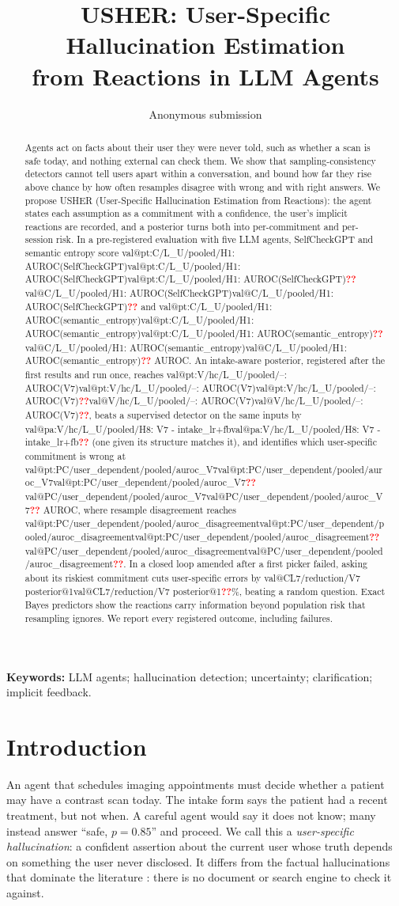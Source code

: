\documentclass[10pt,a4paper,twocolumn]{article}
\title{\textbf{USHER: User-Specific Hallucination Estimation\\from Reactions in LLM Agents}}
\author{Anonymous submission}
\date{}
\makeatletter
\newcommand{\val}[1]{\ifcsname val@#1\endcsname\csname val@#1\endcsname\else\textcolor{red}{\textbf{??}}\fi}
\newcommand{\pt}[1]{\ifcsname val@pt:#1\endcsname\val{pt:#1}\else\val{#1}\fi}
\newif\iffinal \finaltrue
\newcommand{\chk}[1]{\iffinal#1\else\textcolor{blue}{#1}\fi}
\makeatother
\begin{document}
\maketitle

\begin{abstract}
Agents act on facts about their user they were never told, such as whether a
scan is safe today, and nothing external can check them. We show that
sampling-consistency detectors cannot tell users apart within a
conversation, and bound how far they rise above chance by how often
resamples disagree with wrong and with right answers. We propose USHER
(User-Specific Hallucination Estimation from Reactions): the agent states
each assumption as a commitment with a confidence, the user's implicit
reactions are recorded, and a posterior turns both into per-commitment and
per-session risk. In a pre-registered evaluation with five LLM agents,
SelfCheckGPT and semantic entropy score
\pt{C/L_U/pooled/H1: AUROC(SelfCheckGPT)} and
\pt{C/L_U/pooled/H1: AUROC(semantic_entropy)} AUROC. An intake-aware
posterior, registered after the first results and run once, reaches
\pt{V/hc/L_U/pooled/--: AUROC(V7)}, beats a supervised detector on the same
inputs by \val{pa:V/hc/L_U/pooled/H8: V7 - intake_lr+fb} (one given its
structure matches it), and identifies which user-specific commitment is
wrong at \pt{PC/user_dependent/pooled/auroc_V7} AUROC, where resample
disagreement reaches \pt{PC/user_dependent/pooled/auroc_disagreement}.
\chk{In a closed loop amended after a first picker failed, asking about its
riskiest commitment cuts user-specific errors by
\val{CL7/reduction/V7 posterior@1}\%, beating a random question.} Exact
Bayes predictors show the reactions carry information beyond population
risk that resampling ignores. We report every registered outcome, including
failures.
\end{abstract}

\noindent\textbf{Keywords:} LLM agents; hallucination detection; uncertainty; clarification; implicit feedback.

\section{Introduction}

An agent that schedules imaging appointments must decide whether a patient
may have a contrast scan today. The intake form says the patient had a
recent treatment, but not when. A careful agent would say it does not
know; many instead answer ``safe, $p=0.85$'' and proceed. We call this a
\emph{user-specific hallucination}: a confident assertion about the current
user whose truth depends on something the user never disclosed. It differs
from the factual hallucinations that dominate the literature
\citep{ji2023survey}: there is no document or search engine to check it
against.
\end{document}
